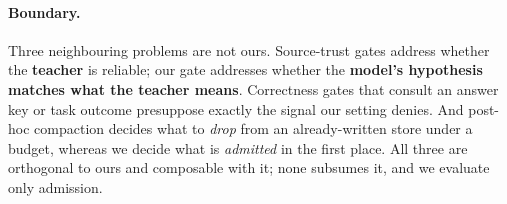 \documentclass[11pt]{article}
\begin{document}
\paragraph{Boundary.}
Three neighbouring problems are not ours. Source-trust gates
\citep{zahn2026writetime,yang2026trustmem} address whether the \textbf{teacher} is
reliable; our gate addresses whether the \textbf{model's hypothesis matches what the
teacher means}. Correctness gates that consult an answer key or task outcome
\citep{zelikman2022star} presuppose exactly the signal our setting denies. And post-hoc
compaction \citep{kim2026memrefine,zou2026demem} decides what to \emph{drop} from an
already-written store under a budget, whereas we decide what is \emph{admitted} in the
first place. All three are orthogonal to ours and composable with it; none subsumes it, and
we evaluate only admission.
\end{document}
